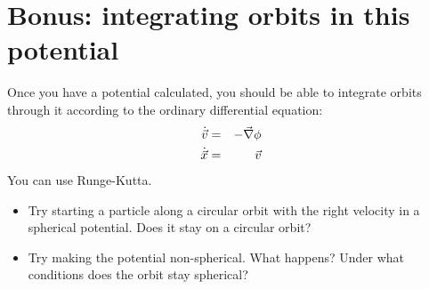 \documentclass[11pt, preprint]{aastex}
\begin{document}
\section{Bonus: integrating orbits in this potential}

Once you have a potential calculated, you should be able to integrate
orbits through it according to the ordinary differential equation: 
\begin{eqnarray}
\dot{\vec{v}} &=& -\vec{\nabla}\phi \cr
\dot{\vec{x}} &=& \vec{v} 
\end{eqnarray}
You can use Runge-Kutta. 

\begin{itemize}
\item Try starting a particle along a circular orbit with the right
  velocity in a spherical potential. Does it stay on a circular orbit?
\item Try making the potential non-spherical. What happens? Under what
  conditions does the orbit stay spherical? 
\end{itemize}
\end{document}
